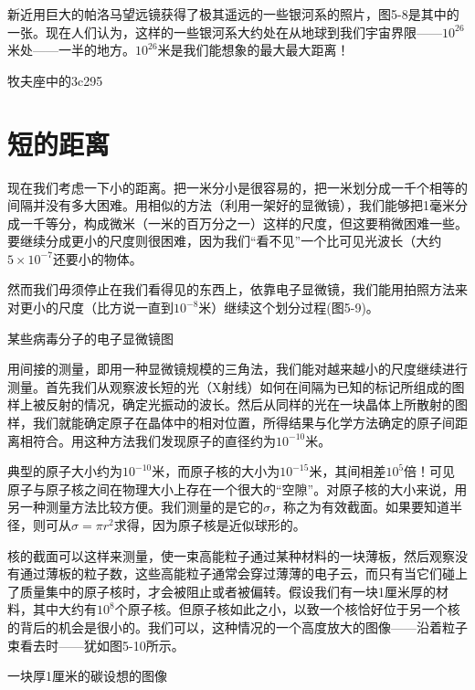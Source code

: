 \documentclass[12pt,oneside]{book}
\begin{document}
\begin{common-format}
新近用巨大的帕洛马望远镜获得了极其遥远的一些银河系的照片，图5-8是其中的一张。现在人们认为，这样的一些银河系大约处在从地球到我们宇宙界限——$ 10^{26} $米处——一半的地方。$ 10^{26} $米是我们能想象的最大最大距离！
\begin{fig}[2.5]{牧夫座中的3c295}
\caption{\footnotesize 最现代化的200英寸望远镜拍摄的最远天体——牧夫座中的3C295（用箭头标出）}
\label{fig:牧夫座中的3c295}
\end{fig}


\section{短的距离}
现在我们考虑一下小的距离。把一米分小是很容易的，把一米划分成一千个相等的间隔并没有多大困难。用相似的方法（利用一架好的显微镜），我们能够把1毫米分成一千等分，构成微米（一米的百万分之一）这样的尺度，但这要稍微困难一些。要继续分成更小的尺度则很困难，因为我们“看不见”一个比可见光波长（大约$ 5\times 10^{-7} $还要小的物体。

然而我们毋须停止在我们看得见的东西上，依靠电子显微镜，我们能用拍照方法来对更小的尺度（比方说一直到$ 10^{-8} $米）继续这个划分过程(图5-9)。
\begin{fig}[2.5]{某些病毒分子的电子显微镜图}
\caption{\footnotesize 某些病毒分子的电子显微镜图。“大的”球是为定标用的，且已知其直径为$ 2\times 10^{-7} $米(2000 Å)}
\label{fig:某些病毒分子的电子显微镜图}
\end{fig}
用间接的测量，即用一种显微镜规模的三角法，我们能对越来越小的尺度继续进行测量。首先我们从观察波长短的光（X射线）如何在间隔为已知的标记所组成的图样上被反射的情况，确定光振动的波长。然后从同样的光在一块晶体上所散射的图样，我们就能确定原子在晶体中的相对位置，所得结果与化学方法确定的原子间距离相符合。用这种方法我们发现原子的直径约为$10^{-10}$米。

典型的原子大小约为$10^{-10}$米，而原子核的大小为$10^{-15}$米，其间相差$10^5$倍！可见原子与原子核之间在物理大小上存在一个很大的“空隙”。对原子核的大小来说，用另一种测量方法比较方便。我们测量的是它的$\sigma$，称之为有效截面。如果要知道半径，则可从$\sigma=\pi r^2$求得，因为原子核是近似球形的。

核的截面可以这样来测量，使一束高能粒子通过某种材料的一块薄板，然后观察没有通过薄板的粒子数，这些高能粒子通常会穿过薄薄的电子云，而只有当它们碰上了质量集中的原子核时，才会被阻止或者被偏转。假设我们有一块1厘米厚的材料，其中大约有$10^8$个原子核。但原子核如此之小，以致一个核恰好位于另一个核的背后的机会是很小的。我们可以，这种情况的一个高度放大的图像——沿着粒子束看去时——犹如图5-10所示。
\begin{fig}{一块厚1厘米的碳设想的图像}
\caption{\footnotesize 在只观察核的时候，通过一块厚1厘米的碳所见到的那个设想的图像}
\label{fig:一块厚1厘米的碳设想的图像}
\end{fig}


\end{common-format}
\end{document}
